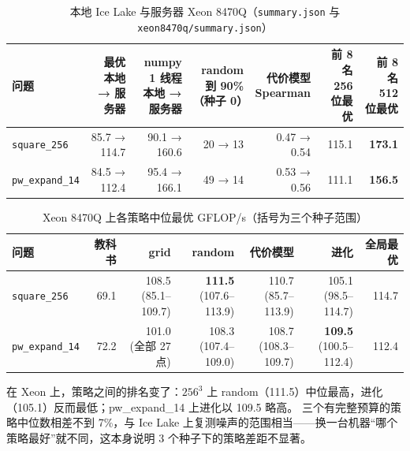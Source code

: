 \documentclass[11pt,a4paper]{ctexart}
\newcommand{\sk}[1]{\texttt{#1}}
\begin{document}
\begin{table}[H]
\centering\small
\caption{本地 Ice Lake 与服务器 Xeon 8470Q（\texttt{summary.json} 与 \texttt{xeon8470q/summary.json}）}\label{tab:xeon}
\setlength{\tabcolsep}{3.5pt}
\begin{tabular}{lrrrrrr}
\toprule
问题 & \makecell[r]{最优\\本地 → 服务器} & \makecell[r]{numpy 1 线程\\本地 → 服务器} & \makecell[r]{random 到 90\%\\（种子 0）} & \makecell[r]{代价模型\\Spearman} & \makecell[r]{前 8 名\\256 位最优} & \makecell[r]{前 8 名\\512 位最优} \\
\midrule
\sk{square\_256} & 85.7 → 114.7 & 90.1 → 160.6 & 20 → 13 & 0.47 → 0.54 & 115.1 & \textbf{173.1} \\
\sk{pw\_expand\_14} & 84.5 → 112.4 & 95.4 → 166.1 & 49 → 14 & 0.53 → 0.56 & 111.1 & \textbf{156.5} \\
\bottomrule
\end{tabular}
\end{table}

\begin{table}[H]
\centering\small
\caption{Xeon 8470Q 上各策略中位最优 GFLOP/s（括号为三个种子范围）}\label{tab:xeonmain}
\begin{tabular}{lrrrrrr}
\toprule
问题 & 教科书 & grid & random & 代价模型 & 进化 & 全局最优 \\
\midrule
\sk{square\_256} & 69.1 & \makecell[r]{108.5\\(85.1--109.7)} & \makecell[r]{\textbf{111.5}\\(107.6--113.9)} & \makecell[r]{110.7\\(85.7--113.9)} & \makecell[r]{105.1\\(98.5--114.7)} & 114.7 \\
\addlinespace
\sk{pw\_expand\_14} & 72.2 & \makecell[r]{101.0\\(全部 27 点)} & \makecell[r]{108.3\\(107.4--109.0)} & \makecell[r]{108.7\\(108.3--109.7)} & \makecell[r]{\textbf{109.5}\\(100.5--112.4)} & 112.4 \\
\bottomrule
\end{tabular}
\end{table}

在 Xeon 上，策略之间的排名变了：$256^3$ 上 random（111.5）中位最高，进化（105.1）反而最低；pw\_expand\_14 上进化以 109.5 略高。
三个有完整预算的策略中位数相差不到 7\%，与 Ice Lake 上复测噪声的范围相当——换一台机器“哪个策略最好”就不同，这本身说明 3 个种子下的策略差距不显著。
\end{document}
